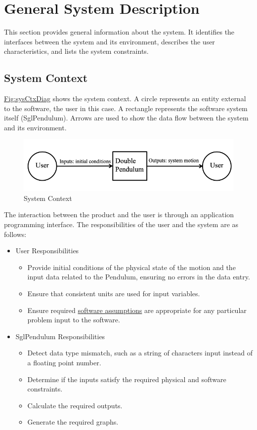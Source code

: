 \documentclass[12pt]{article}
\begin{document}
\section{General System Description}
\label{Sec:GenSysDesc}
This section provides general information about the system. It identifies the interfaces between the system and its environment, describes the user characteristics, and lists the system constraints.

\subsection{System Context}
\label{Sec:SysContext}
\hyperref[Figure:sysCtxDiag]{Fig:sysCtxDiag} shows the system context. A circle represents an entity external to the software, the user in this case. A rectangle represents the software system itself (SglPendulum). Arrows are used to show the data flow between the system and its environment.

\begin{figure}
\begin{center}
\includegraphics[width=\textwidth]{../../../datafiles/DblPendulum/SystemContextFigure.png}
\caption{System Context}
\label{Figure:sysCtxDiag}
\end{center}
\end{figure}
The interaction between the product and the user is through an application programming interface. The responsibilities of the user and the system are as follows:

\begin{itemize}
\item{User Responsibilities}
\begin{itemize}
\item{Provide initial conditions of the physical state of the motion and the input data related to the Pendulum, ensuring no errors in the data entry.}
\item{Ensure that consistent units are used for input variables.}
\item{Ensure required \hyperref[Sec:Assumps]{software assumptions} are appropriate for any particular problem input to the software.}
\end{itemize}
\item{SglPendulum Responsibilities}
\begin{itemize}
\item{Detect data type mismatch, such as a string of characters input instead of a floating point number.}
\item{Determine if the inputs satisfy the required physical and software constraints.}
\item{Calculate the required outputs.}
\item{Generate the required graphs.}
\end{itemize}
\end{itemize}
\end{document}
